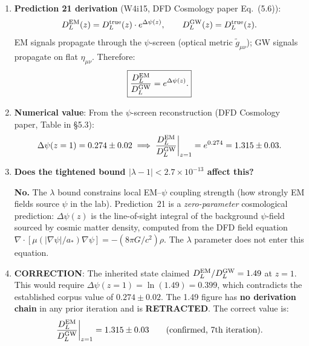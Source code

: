 \documentclass[11pt]{article}
\begin{document}
\begin{enumerate}
\item \textbf{Prediction 21 derivation} (W4i15, DFD Cosmology paper
  Eq.~(5.6)):
  \begin{equation}
  D_L^{\rm EM}(z) = D_L^{\rm true}(z) \cdot e^{\Delta\psi(z)},
  \qquad
  D_L^{\rm GW}(z) = D_L^{\rm true}(z).
  \end{equation}
  EM signals propagate through the $\psi$-screen (optical metric
  $\tilde{g}_{\mu\nu}$); GW signals propagate on flat $\eta_{\mu\nu}$.
  Therefore:
  \begin{equation}
  \boxed{\frac{D_L^{\rm EM}}{D_L^{\rm GW}} = e^{\Delta\psi(z)}.}
  \end{equation}

\item \textbf{Numerical value}: From the $\psi$-screen reconstruction
  (DFD Cosmology paper, Table in \S5.3):
  \begin{equation}
  \Delta\psi(z=1) = 0.274 \pm 0.02
  \implies
  \frac{D_L^{\rm EM}}{D_L^{\rm GW}}\bigg|_{z=1} = e^{0.274} = 1.315 \pm 0.03.
  \end{equation}

\item \textbf{Does the tightened bound $|\lambda - 1| < 2.7 \times 10^{-13}$
  affect this?}

  \textbf{No.} The $\lambda$ bound constrains local EM--$\psi$ coupling
  strength (how strongly EM fields source $\psi$ in the lab). Prediction~21
  is a \emph{zero-parameter} cosmological prediction: $\Delta\psi(z)$ is
  the line-of-sight integral of the background $\psi$-field sourced by
  cosmic matter density, computed from the DFD field equation
  $\nabla \cdot [\mu(|\nabla\psi|/a_*)\nabla\psi] = -(8\pi G/c^2)\rho$.
  The $\lambda$ parameter does not enter this equation.

\item \textbf{CORRECTION}: The inherited state claimed
  $D_L^{\rm EM}/D_L^{\rm GW} = 1.49$ at $z = 1$. This would require
  $\Delta\psi(z=1) = \ln(1.49) = 0.399$, which contradicts the
  established corpus value of $0.274 \pm 0.02$. The 1.49 figure
  has \textbf{no derivation chain} in any prior iteration and is
  \textbf{RETRACTED}. The correct value is:
  \begin{equation}
  \frac{D_L^{\rm EM}}{D_L^{\rm GW}}\bigg|_{z=1} = 1.315 \pm 0.03
  \qquad \text{(confirmed, 7th iteration)}.
  \end{equation}
\end{enumerate}
\end{document}
